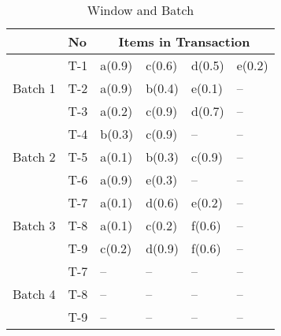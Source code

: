 \documentclass{article}
\begin{document}
\begin{table}
\centering

\begin{tabular}{|l|l|l|l|l|l|}
\hline
	& No & \multicolumn{4}{c|}{Items in Transaction} \\ \hline \hline
	\multirow{3}{*}{Batch 1}	&	T-1 & a(0.9) & c(0.6) & d(0.5) & e(0.2)			\\\cline{2-6}
								&	T-2 & a(0.9) & b(0.4) & e(0.1) & --    			\\\cline{2-6}
								&	T-3 & a(0.2) & c(0.9) & d(0.7) & --    			\\\hline
	\multirow{3}{*}{Batch 2}			&	T-4 & b(0.3) & c(0.9) & -- & --			\\\cline{2-6}
								&	T-5 & a(0.1) & b(0.3) & c(0.9) & --    			\\\cline{2-6}
								&	T-6 & a(0.9) & e(0.3) & -- & --        			\\\hline
	\multirow{3}{*}{Batch 3}			&	T-7 & a(0.1) & d(0.6) & e(0.2) & --		\\\cline{2-6}
								&	T-8 & a(0.1) & c(0.2) & f(0.6) & --    			\\\cline{2-6}
								&	T-9 & c(0.2) & d(0.9) & f(0.6) & --    			\\\hline

	\multirow{3}{*}{Batch 4}	&	T-7 &  --  &  --  &  --  & --    				\\\cline{2-6}
								&	T-8 &  --  &  --  &  --  & --    				\\\cline{2-6}
								&	T-9 &  --  &  --  &  --  & --    				\\\hline
	\end{tabular}
\caption{Window and Batch }
\end{table}
\end{document}
